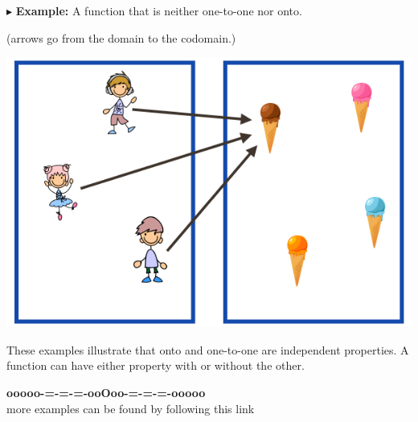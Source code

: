 \documentclass{ximera}
\begin{document}
$\blacktriangleright$ \textbf{Example:} A function that is neither one-to-one nor onto.  \\

\begin{center}
(arrows go from the domain to the codomain.)
\begin{image}
\includegraphics{pics/neither.png}
\end{image}
\end{center}




These examples illustrate that onto and one-to-one are independent properties.  A function can have either property with or without the other.















\begin{onlineOnly}
\begin{center}
\textbf{\textcolor{green!50!black}{ooooo-=-=-=-ooOoo-=-=-=-ooooo}} \\

more examples can be found by following this link\\ 

\end{center}
\end{onlineOnly}
\end{document}
